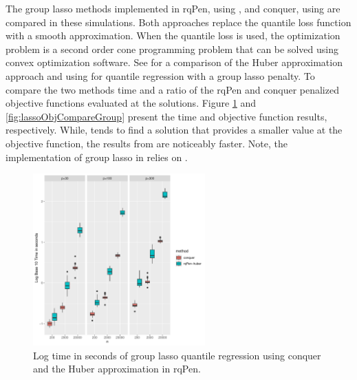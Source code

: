 The group lasso methods implemented in rqPen, using , and conquer, using  are compared in these simulations. Both approaches replace the quantile loss function with a smooth approximation. When the quantile loss is used, the optimization problem is a second order cone programming problem that can be solved using convex optimization software. See \citet{SherwoodLi2022} for a comparison of the Huber approximation approach and using  for quantile regression with a group lasso penalty. To compare the two methods time and a ratio of the rqPen and conquer penalized objective functions evaluated at the solutions. Figure \ref{fig:lassoSpeedCompareGroup} and \ref{fig:lassoObjCompareGroup} present the time and objective function results, respectively. While,  tends to find a solution that provides a smaller value at the objective function, the results from  are noticeably faster. Note, the implementation of group lasso in  relies on .

\begin{figure}

{\centering \includegraphics[width=250px,height=250px]{figures/lassoSpeedCompareGroup} 

}

\caption{Log time in seconds of group lasso quantile regression using conquer and the Huber approximation in rqPen.}\label{fig:lassoSpeedCompareGroup}
\end{figure}

